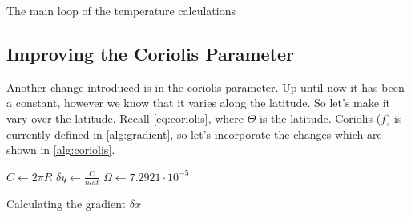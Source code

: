 \begin{algorithm}[hbt]
    \SetAlgoLined

    \caption{The main loop of the temperature calculations}
    \label{alg:temperature with density}
\end{algorithm}

\subsection{Improving the Coriolis Parameter}
Another change introduced is in the coriolis parameter. Up until now it has been a constant, however we know that it varies along the latitude. So let's make it vary over the latitude. Recall 
\autoref{eq:coriolis}, where $\Theta$ is the latitude. Coriolis ($f$) is currently defined in \autoref{alg:gradient}, so let's incorporate the changes which are shown in \autoref{alg:coriolis}.

\begin{algorithm}
    \SetAlgoLined
    $C \leftarrow 2\pi R$ \;
    $\delta y \leftarrow \frac{C}{nlat}$ \;
    $\Omega \leftarrow 7.2921 \cdot 10^{-5}$ \;

    \caption{Calculating the gradient $\delta x$}
    \label{alg:coriolis}
\end{algorithm}